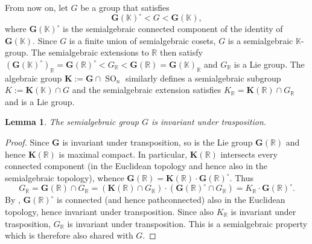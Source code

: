 \documentclass[12pt]{amsart}
\newcommand{\R}{\mathbb{R} }
\newcommand{\K}{\mathbb{K}}
\newcommand{\bG}{\mathbf{G}}
\newcommand{\bK}{\mathbf{K}}
\numberwithin{equation}{section}
\newtheorem{lemma}[theorem]{Lemma}
\theoremstyle{remark} %
\begin{document}
From now on, let $G$ be a group that satisfies 
$$
\bG(\K)^\circ < G < \bG(\K),
$$
where $\bG(\K)^\circ$ is the semialgebraic connected component of the identity of $\bG(\K)$. Since $G$ is a finite union of semialgebraic cosets, $G$ is a semialgebraic $\K$-group. The semialgebraic extensions to $\R$ then satisfy $(\bG(\K)^\circ)_\R = \bG(\R)^\circ < G_\R < \bG(\R) = \bG(\K)_\R$ and $G_\R$ is a Lie group. The algebraic group $\bK:= \bG \cap \operatorname{SO}_n$ similarly defines a semialgebraic subgroup $K:= \bK(\K) \cap G$ and the semialgebraic extension satisfies $K_\R = \bK(\R) \cap G_\R$ and is a Lie group.
\begin{lemma}
	The semialgebraic group $G$ is invariant under trasposition. 
\end{lemma}
\begin{proof}
	Since $\bG$ is invariant under transposition, so is the Lie group $\bG(\R)$ and hence $\bK(\R)$ is maximal compact. In particular, $\bK(\R)$ intersects every connected component (in the Euclidean topology and hence also in the semialgebraic topology), whence $\bG(\R) = \bK(\R) \cdot \bG(\R)^\circ$. Thus
	$$
	G_\R = \bG(\R) \cap G_\R = (\bK(\R) \cap G_\R) \cdot (\bG(\R)^\circ \cap G_\R) = K_\R \cdot \bG(\R)^\circ.
	$$
	By \cite[Theorem 2.4.5]{BCR}, $\bG(\R)^\circ$ is connected (and hence pathconnected) also in the Euclidean topology, hence invariant under transposition. Since also $K_\R$ is invariant under trasposition, $G_\R$ is invariant under transposition. This is a semialgebraic property which is therefore also shared with $G$.
\end{proof}
\end{document}

